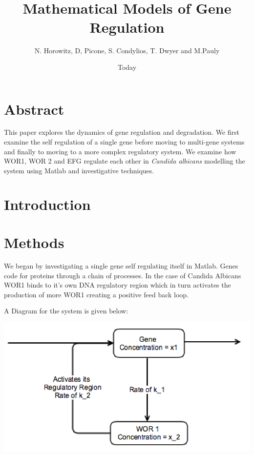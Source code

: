 \documentclass[]{article}
\begin{document}
\title{Mathematical Models of Gene Regulation}
\author{N. Horowitz, D, Picone, S. Condylios, T. Dwyer and M.Pauly}
\date{Today}
\maketitle

\section*{Abstract}
This paper explores the dynamics of gene regulation and degradation. We first examine the self regulation of a single gene before moving to multi-gene systems and finally to moving to a more complex regulatory system. We examine how WOR1, WOR 2 and EFG regulate each other in \textit{Candida albicans} modelling the system using Matlab and investigative techniques.
\section*{Introduction}

\pagebreak
\section*{Methods}

We began by investigating a single gene self regulating itself in Matlab. Genes code for proteins through a chain of processes.  In the case of Candida Albicans WOR1 binds to it's own DNA regulatory region which in turn activates the production of more WOR1 creating a positive feed back loop. 

A Diagram for the system is given below:\\

\begin{center}
\includegraphics[scale = 0.75]{Posfeed.png}
\end{center}
\end{document}

